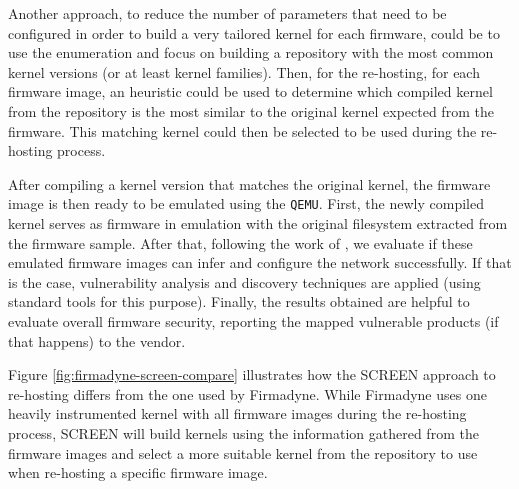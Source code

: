 Another approach, to reduce the number of parameters that need to be configured in order to build a very tailored kernel for each firmware, could be to use the enumeration and focus on building a repository with the most common kernel versions (or at least kernel families). Then, for the re-hosting, for each firmware image, an heuristic could be used to determine which compiled kernel from the repository is the most similar to the original kernel expected from the firmware. This matching kernel could then be selected to be used during the re-hosting process.

After compiling a kernel version that matches the original kernel, the firmware image is then ready to be emulated using the {\tt QEMU}. First, the newly compiled kernel serves as firmware in emulation with the original filesystem extracted from the firmware sample. After that, following the work of \cite{firmadyne}, we evaluate if these emulated firmware images can infer and configure the network successfully. If that is the case, vulnerability analysis and discovery techniques are applied (using standard tools for this purpose). Finally, the results obtained are helpful to evaluate overall firmware security, reporting the mapped vulnerable products (if that happens) to the vendor.

Figure \ref{fig:firmadyne-screen-compare} illustrates how the SCREEN approach to re-hosting differs from the one used by Firmadyne. While Firmadyne uses one heavily instrumented kernel with all firmware images during the re-hosting process, SCREEN will build kernels using the information gathered from the firmware images and select a more suitable kernel from the repository to use when re-hosting a specific firmware image.

